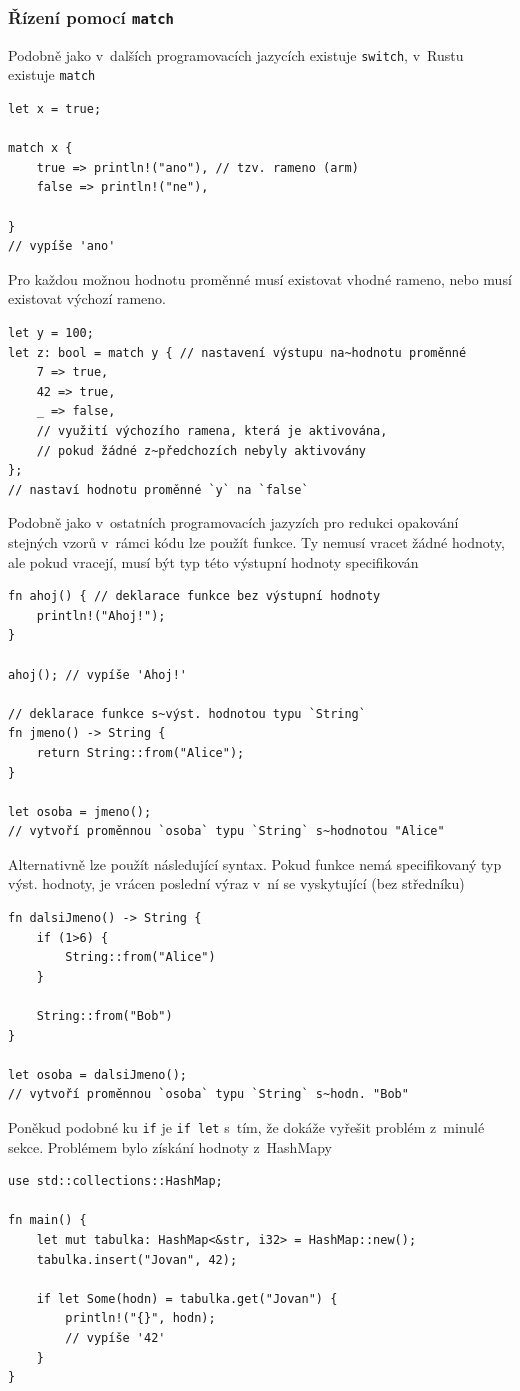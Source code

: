 \documentclass[a4paper, 12pt]{article} %
\newcommand{\rust}[1]{\texttt{#1}}
\begin{document}
		\subsubsection*{Řízení pomocí \rust{match}}
			Podobně jako v~dalších programovacích jazycích existuje \texttt{switch}, v~Rustu existuje \rust{match}
			\begin{verbatim}
let x = true;

match x {
	true => println!("ano"), // tzv. rameno (arm)
	false => println!("ne"),
			
}
// vypíše 'ano'
			\end{verbatim}
			
			Pro každou možnou hodnotu proměnné musí existovat vhodné rameno, nebo musí existovat výchozí rameno.
			\begin{verbatim}
let y = 100;
let z: bool = match y { // nastavení výstupu na~hodnotu proměnné
	7 => true,
	42 => true,
	_ => false,
	// využití výchozího ramena, která je aktivována, 
	// pokud žádné z~předchozích nebyly aktivovány
};
// nastaví hodnotu proměnné `y` na `false`
		\end{verbatim}
		
		Podobně jako v~ostatních programovacích jazyzích pro redukci opakování stejných vzorů v~rámci kódu lze použít funkce. Ty nemusí vracet žádné hodnoty, ale pokud vracejí, musí být typ této výstupní hodnoty specifikován
		\begin{verbatim}
fn ahoj() { // deklarace funkce bez výstupní hodnoty
	println!("Ahoj!");
}

ahoj(); // vypíše 'Ahoj!'

// deklarace funkce s~výst. hodnotou typu `String`
fn jmeno() -> String {
	return String::from("Alice");
}

let osoba = jmeno();
// vytvoří proměnnou `osoba` typu `String` s~hodnotou "Alice"
		\end{verbatim}
		
		Alternativně lze použít následující syntax. Pokud funkce nemá specifikovaný typ výst. hodnoty, je vrácen poslední výraz v~ní se vyskytující (bez středníku)
		\begin{verbatim}
fn dalsiJmeno() -> String {
	if (1>6) {
		String::from("Alice")
	}

	String::from("Bob")
}

let osoba = dalsiJmeno();
// vytvoří proměnnou `osoba` typu `String` s~hodn. "Bob"
		\end{verbatim}
		
		Poněkud podobné ku \rust{if} je \rust{if let} s~tím, že dokáže vyřešit problém z~minulé sekce. Problémem bylo získání hodnoty z~HashMapy
		\begin{verbatim}
use std::collections::HashMap;

fn main() {
	let mut tabulka: HashMap<&str, i32> = HashMap::new();
	tabulka.insert("Jovan", 42); 
	
	if let Some(hodn) = tabulka.get("Jovan") {
		println!("{}", hodn);
		// vypíše '42'
	}
}
		\end{verbatim}
		
\end{document}
